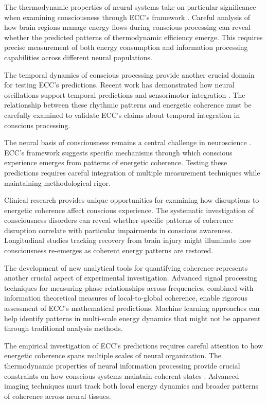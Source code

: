 The thermodynamic properties of neural systems take on particular significance when examining consciousness through ECC's framework \cite{Sherrington2018}. Careful analysis of how brain regions manage energy flows during conscious processing can reveal whether the predicted patterns of thermodynamic efficiency emerge. This requires precise measurement of both energy consumption and information processing capabilities across different neural populations.

The temporal dynamics of conscious processing provide another crucial domain for testing ECC's predictions. Recent work has demonstrated how neural oscillations support temporal predictions and sensorimotor integration \cite{Palva2018}. The relationship between these rhythmic patterns and energetic coherence must be carefully examined to validate ECC's claims about temporal integration in conscious processing.

The neural basis of consciousness remains a central challenge in neuroscience \cite{Kucyi2017}. ECC's framework suggests specific mechanisms through which conscious experience emerges from patterns of energetic coherence. Testing these predictions requires careful integration of multiple measurement techniques while maintaining methodological rigor.

Clinical research provides unique opportunities for examining how disruptions to energetic coherence affect conscious experience. The systematic investigation of consciousness disorders can reveal whether specific patterns of coherence disruption correlate with particular impairments in conscious awareness. Longitudinal studies tracking recovery from brain injury might illuminate how consciousness re-emerges as coherent energy patterns are restored.

The development of new analytical tools for quantifying coherence represents another crucial aspect of experimental investigation. Advanced signal processing techniques for measuring phase relationships across frequencies, combined with information theoretical measures of local-to-global coherence, enable rigorous assessment of ECC's mathematical predictions. Machine learning approaches can help identify patterns in multi-scale energy dynamics that might not be apparent through traditional analysis methods.

The empirical investigation of ECC's predictions requires careful attention to how energetic coherence spans multiple scales of neural organization. The thermodynamic properties of neural information processing provide crucial constraints on how conscious systems maintain coherent states \cite{Sherrington2018}. Advanced imaging techniques must track both local energy dynamics and broader patterns of coherence across neural tissues.

